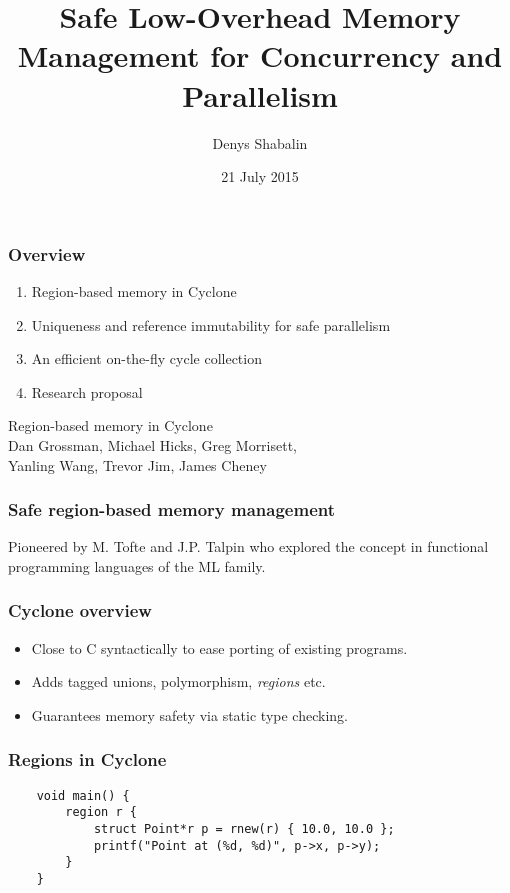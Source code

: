 \title{Safe Low-Overhead Memory Management for Concurrency and Parallelism}
\author{Denys Shabalin}
\date{21 July 2015}
{
\begin{frame}
    \titlepage
\end{frame}
}


\begin{frame}
    \frametitle{Overview}
    \begin{enumerate}
        \item Region-based memory in Cyclone
        \item Uniqueness and reference immutability for safe parallelism
        \item An efficient on-the-fly cycle collection
        \item Research proposal
    \end{enumerate}
\end{frame}

\begin{frame}
    \begin{center}
        {\LARGE Region-based memory in Cyclone} \\
        \vspace{20pt}
        Dan Grossman, Michael Hicks, Greg Morrisett,\\
        Yanling Wang, Trevor Jim, James Cheney
    \end{center}
\end{frame}

\begin{frame}
    \frametitle{Safe region-based memory management}

    Pioneered by M. Tofte and J.P. Talpin who explored the concept in functional
    programming languages of the ML family.
\end{frame}

\begin{frame}
    \frametitle{Cyclone overview}
    \begin{itemize}
        \item Close to C syntactically to ease porting of existing programs.
        \item Adds tagged unions, polymorphism, \textit{regions} etc.
        \item Guarantees memory safety via static type checking.
    \end{itemize}
\end{frame}

\begin{frame}[fragile]
    \frametitle{Regions in Cyclone}
    \begin{verbatim}
    void main() {
        region r {
            struct Point*r p = rnew(r) { 10.0, 10.0 };
            printf("Point at (%d, %d)", p->x, p->y);
        }
    }
    \end{verbatim}
\end{frame}

